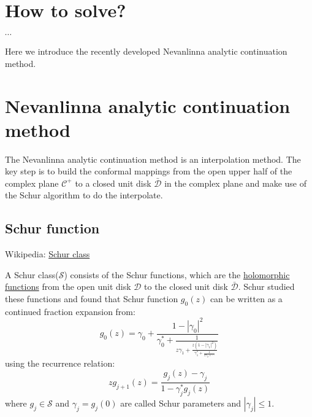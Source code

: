 \documentclass[
	preprint,%
	aps,
	prb,
	showpacs,	
	amsmath, amssymb]{revtex4-2}
\DeclareRobustCommand{\+}{\hstretch{1.25} {\boldsymbol {\mathrel{+}}}}
\newcommand{\C}{ {\mathcal{C}} }
\newcommand{\D}{ {\mathcal{D}} }
\newcommand{\Dbar}{ {\bar{\mathcal{D}}} }
\begin{document}
\section{How to solve?}
\label{sec:how-to-solve}

$\cdots$

Here we introduce the recently developed Nevanlinna 
analytic continuation method\cite{fei2021nevanlinna}.      
\section{Nevanlinna analytic continuation method}
\label{sec:nevanlinna-analytical-continuation-method}

The Nevanlinna analytic continuation method\cite{fei2021nevanlinna} 
is an interpolation method. The key step is to build the conformal mappings 
from the open upper half of the complex plane $\C^+$ 
to a closed unit disk $\Dbar$ in the complex plane and 
make use of the Schur algorithm\cite{schur1918potenzreihen} to do the interpolate.

\subsection{Schur function}
\label{subsec:schur-function}

Wikipedia: 
\href{https://en.wikipedia.org/wiki/Schur_class}{Schur class}

A Schur class($\mathcal{S}$) consists of the Schur functions, which are the 
\href{https://en.wikipedia.org/wiki/Holomorphic_function}{holomorphic functions} 
from the open unit disk $\D$ to 
the closed unit disk $\Dbar$. 
Schur\cite{schur1918potenzreihen} studied 
these functions and found that Schur function $g_0(z)$ can be written as 
a continued fraction expansion from:
\begin{equation}\label{eq:Schur-algorithm}
	g_0(z) = \gamma_0 + \frac{1-|\gamma_0|^2}{\gamma_0^* + \frac{1}{
		z\gamma_1 + \frac{z(1-|\gamma_1|^2)}{
			\gamma_1^* + \frac{1}{z\gamma_2 + \cdots}
			}
			}}
\end{equation}
using the recurrence relation:
\begin{equation}\label{eq:schur-function-recursion}
	zg_{j+1}(z) = \frac{g_j(z) - \gamma_j}{1 - \gamma_j^* g_j(z)}
\end{equation}
where $g_j \in \mathcal{S}$ and $\gamma_j = g_j(0)$ are called Schur 
parameters and $|\gamma_j| \leq 1$. 
\end{document}
